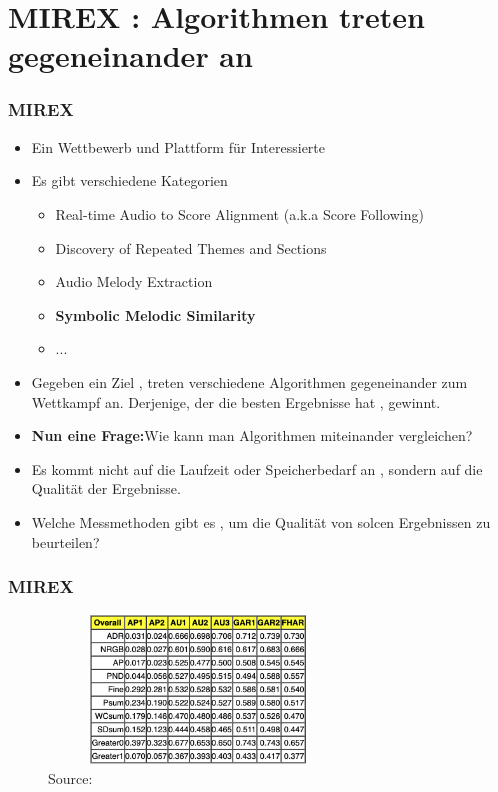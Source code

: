 \documentclass{beamer}
\begin{document}
	\section{MIREX : Algorithmen treten gegeneinander an}

	\begin{frame}
		\frametitle{MIREX}
		\begin{itemize}
			\item Ein Wettbewerb und Plattform für Interessierte
			\item Es gibt verschiedene Kategorien
				\begin{itemize}
					\item Real-time Audio to Score Alignment (a.k.a Score Following)
					\item Discovery of Repeated Themes and Sections
					\item Audio Melody Extraction
					\item \textbf{Symbolic Melodic Similarity}
					\item ...
				\end{itemize}
			\item Gegeben ein Ziel , treten verschiedene Algorithmen gegeneinander zum Wettkampf an. Derjenige, der die besten Ergebnisse hat , gewinnt. 
			\item \textbf{Nun eine Frage:}Wie kann man Algorithmen miteinander vergleichen?
			\item Es kommt nicht auf die Laufzeit oder Speicherbedarf an , sondern auf die Qualität der Ergebnisse.
			\item Welche Messmethoden gibt es , um die Qualität von solcen Ergebnissen zu beurteilen?
		\end{itemize}
	\end{frame}

	\begin{frame}
		\frametitle{MIREX}
		\begin{figure}[h!]
			\includegraphics[width=300px,height=150px,keepaspectratio]{mirex_result_example}
			\caption{Source: \cite{mirex_website_2007_results}}
		\end{figure}
	\end{frame}
\end{document}
